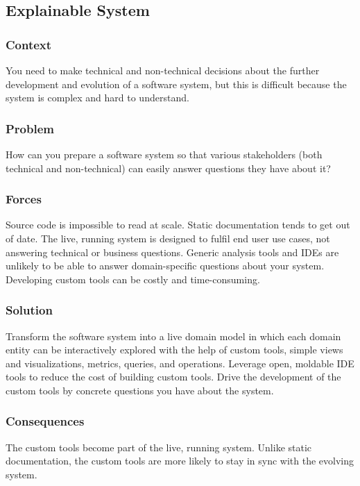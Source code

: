 \documentclass[sigconf]{acmart}
\begin{document}
\subsection*{Explainable System}\label{pat:explainableSystem}

\subsubsection*{Context}
You need to make technical and non-technical decisions about the further development and evolution of a software system, but this is difficult because the system is complex and hard to understand.

\subsubsection*{Problem}
How can you prepare a software system so that various stakeholders (both technical and non-technical) can easily answer questions they have about it?

\subsubsection*{Forces}
Source code is impossible to read at scale.
Static documentation tends to get out of date.
The live, running system is designed to fulfil end user use cases, not answering technical or business questions.
Generic analysis tools and IDEs are unlikely to be able to answer domain-specific questions about your system.
Developing custom tools can be costly and time-consuming.

\subsubsection*{Solution}
Transform the software system into a live domain model in which each domain entity can be interactively explored with the help of custom tools, \ie simple views and visualizations, metrics, queries, and operations.
Leverage open, moldable IDE tools to reduce the cost of building custom tools.
Drive the development of the custom tools by concrete questions you have about the system.

\subsubsection*{Consequences}
The custom tools become part of the live, running system.
Unlike static documentation, the custom tools are more likely to stay in sync with the evolving system.
\end{document}
